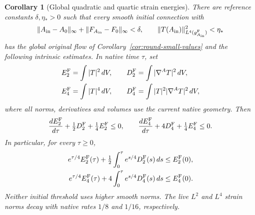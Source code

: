 \documentclass[11pt]{article}
\numberwithin{equation}{section}
\newtheorem{corollary}[theorem]{Corollary}
\theoremstyle{definition}
\theoremstyle{remark}
\begin{document}
\begin{corollary}[Global quadratic and quartic strain energies]
\label{cor:global-value-strain-energy}
There are reference constants \(\delta,\eta_*>0\) such that
every smooth initial connection with
\[
 \|A_{\rm in}-A_0\|_\infty+
       \|F_{A_{\rm in}}-F_0\|_\infty<\delta,\qquad
 \|T(A_{\rm in})\|_{L^4(g_{A_{\rm in}}^{\rm F})}^2<\eta_*
\]
has the global original flow of
Corollary~\ref{cor:round-small-values} and the following
intrinsic estimates. In native time \(\tau\), set
\[
 \begin{split}
 E_2^{\rm F}&=\int|T|^2\,dV,\qquad
 D_2^{\rm F}=\int|\nabla^AT|^2\,dV,\\
 E_4^{\rm F}&=\int|T|^4\,dV,\qquad
 D_4^{\rm F}=\int|T|^2|\nabla^AT|^2\,dV ,
 \end{split}
\]
where all norms, derivatives and volumes use the current
native geometry. Then
\[
 \frac{dE_2^{\rm F}}{d\tau}+\tfrac12D_2^{\rm F}
                  +\tfrac14E_2^{\rm F}\le0,\qquad
 \frac{dE_4^{\rm F}}{d\tau}+4D_4^{\rm F}
                  +\tfrac14E_4^{\rm F}\le0 .
\]
In particular, for every \(\tau\ge0\),
\[
 \begin{split}
 e^{\tau/4}E_2^{\rm F}(\tau)
       +\tfrac12\int_0^\tau e^{s/4}D_2^{\rm F}(s)\,ds
                 &\le E_2^{\rm F}(0),\\
 e^{\tau/4}E_4^{\rm F}(\tau)
       +4\int_0^\tau e^{s/4}D_4^{\rm F}(s)\,ds
                 &\le E_4^{\rm F}(0).
 \end{split}
\]
Neither initial threshold uses higher smooth norms.
The live \(L^2\) and \(L^4\) strain norms decay with native
rates \(1/8\) and \(1/16\), respectively.
\end{corollary}
\end{document}
